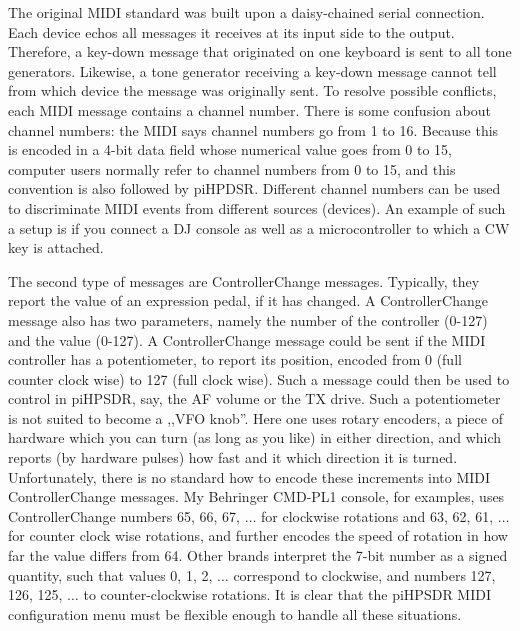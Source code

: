 \documentclass[12pt]{book}
\begin{document}
The original MIDI standard was built upon a daisy-chained serial connection. Each device
echos all messages it receives at its input side to the output. Therefore, a key-down
message that originated on one keyboard is sent to all tone generators. Likewise, a tone
generator receiving a key-down message cannot tell from which device the message
was originally sent. To resolve possible conflicts, each MIDI message contains a channel
number. There is some confusion about channel numbers: the MIDI says channel numbers
go from 1 to 16. Because this is encoded in a 4-bit data field whose numerical value
goes from 0 to 15, computer users normally refer to channel numbers from 0 to 15,
and this convention is also followed by piHPDSR. Different channel numbers can be used
to discriminate MIDI events from different sources (devices). An example of such a setup
is if you connect a DJ console as well as a microcontroller to which a CW key is attached.

The second type of messages are ControllerChange messages. Typically, they report the value of
an expression pedal, if it has changed. A ControllerChange message also has two parameters,
namely the number of the controller (0-127) and the value (0-127). A ControllerChange
message could be sent if the MIDI controller has a potentiometer, to report its position,
encoded from 0 (full counter clock wise) to 127 (full clock wise). Such a message could then be
used to control in piHPSDR, say, the AF volume or the TX drive. Such a potentiometer is
not suited to become a ,,VFO knob''. Here one uses rotary encoders, a piece of hardware which
you can turn (as long as you like) in either direction, and which reports (by hardware pulses)
how fast and it which direction it is turned. Unfortunately, there is no standard how to
encode these increments into MIDI ControllerChange messages. My Behringer CMD-PL1 console,
for examples, uses ControllerChange numbers 65, 66, 67, $\ldots$ for clockwise rotations
and 63, 62, 61, $\ldots$ for counter clock wise rotations, and further encodes the speed of
rotation in how far the value differs from 64. Other brands interpret the 7-bit number
as a signed quantity, such that values 0, 1, 2, $\ldots$ correspond to clockwise,
and numbers 127, 126, 125, $\ldots$ to counter-clockwise rotations. It is clear that
the piHPSDR MIDI configuration menu must be flexible enough to handle all these situations.
\end{document}
